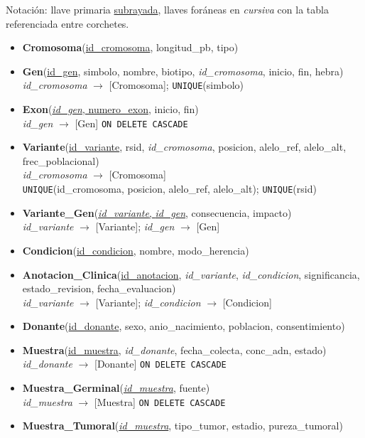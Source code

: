 \documentclass[11pt,a4paper]{article}
\newcommand{\pk}[1]{\underline{#1}}
\newcommand{\fk}[1]{\textit{#1}}
\newcommand{\tb}[1]{\texttt{#1}}
\begin{document}
Notación: llave primaria \pk{subrayada}, llaves foráneas en \fk{cursiva} con la tabla referenciada entre corchetes.

\begin{itemize}[leftmargin=1.2em, itemsep=0.4em]
  \item \textbf{Cromosoma}(\pk{id\_cromosoma}, longitud\_pb, tipo)
  \item \textbf{Gen}(\pk{id\_gen}, simbolo, nombre, biotipo, \fk{id\_cromosoma}, inicio, fin, hebra)\\
        \fk{id\_cromosoma} $\rightarrow$ [Cromosoma]; \quad \tb{UNIQUE}(simbolo)
  \item \textbf{Exon}(\pk{\fk{id\_gen}, numero\_exon}, inicio, fin)\\
        \fk{id\_gen} $\rightarrow$ [Gen] \tb{ON DELETE CASCADE}
  \item \textbf{Variante}(\pk{id\_variante}, rsid, \fk{id\_cromosoma}, posicion, alelo\_ref, alelo\_alt, frec\_poblacional)\\
        \fk{id\_cromosoma} $\rightarrow$ [Cromosoma]\\ \tb{UNIQUE}(id\_cromosoma, posicion, alelo\_ref, alelo\_alt); \quad \tb{UNIQUE}(rsid)
  \item \textbf{Variante\_Gen}(\pk{\fk{id\_variante}, \fk{id\_gen}}, consecuencia, impacto)\\
        \fk{id\_variante} $\rightarrow$ [Variante]; \quad \fk{id\_gen} $\rightarrow$ [Gen]
  \item \textbf{Condicion}(\pk{id\_condicion}, nombre, modo\_herencia)
  \item \textbf{Anotacion\_Clinica}(\pk{id\_anotacion}, \fk{id\_variante}, \fk{id\_condicion}, significancia, estado\_revision, fecha\_evaluacion)\\
        \fk{id\_variante} $\rightarrow$ [Variante]; \quad \fk{id\_condicion} $\rightarrow$ [Condicion]
  \item \textbf{Donante}(\pk{id\_donante}, sexo, anio\_nacimiento, poblacion, consentimiento)
  \item \textbf{Muestra}(\pk{id\_muestra}, \fk{id\_donante}, fecha\_colecta, conc\_adn, estado)\\
        \fk{id\_donante} $\rightarrow$ [Donante] \tb{ON DELETE CASCADE}
  \item \textbf{Muestra\_Germinal}(\pk{\fk{id\_muestra}}, fuente)\\
        \fk{id\_muestra} $\rightarrow$ [Muestra] \tb{ON DELETE CASCADE}
  \item \textbf{Muestra\_Tumoral}(\pk{\fk{id\_muestra}}, tipo\_tumor, estadio, pureza\_tumoral)\\

\end{itemize}
\end{document}
